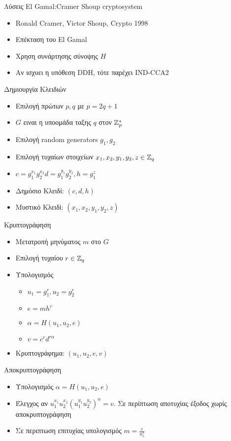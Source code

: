 \documentclass{beamer}
\begin{document}
\begin{frame}[allowframebreaks]{Λύσεις El Gamal:Cramer Shoup cryptosystem \cite{cs98}}
\begin{itemize}
\item Ronald Cramer, Victor Shoup, Crypto 1998
\item Επέκταση του El Gamal
\item Χρηση συνάρτησης σύνοψης $H$
\item Αν ισχυει η υπόθεση DDH, τότε παρέχει IND-CCA2
\end{itemize}

\begin{block}{Δημιουργία Κλειδιών}
\begin{itemize}
\item Επιλογή πρώτων $p,q$ με $p=2q+1$
\item $G$ ειναι η υποομάδα ταξης $q$ στον $\mathbb{Z}_{p}^*$
\item Επιλογή random generators $g_1, g_2$

\item Επιλογή τυχαίων στοιχείων $x_1,x_2,y_1,y_2,z \in \mathbb{Z}_{q}$
\item $c=g_1^{x_1}g_2^{x_2} d=g_1^{y_1}g_2^{y_2},h=g_1^{z}$
\item Δημόσιο Κλειδί: $(c,d,h)$
\item Μυστικό Κλειδί: $(x_1,x_2,y_1,y_2,z)$
\end{itemize}
\end{block}

\begin{block}{Κρυπτογράφηση}
\begin{itemize}
\item Μετατροπή μηνύματος $m$ στο $G$
\item Επιλογή τυχαίου $r \in \mathbb{Z}_{q}$
\item Υπολογισμός
\begin{itemize} 
\item $u_1 = g_1^r,u_2 = g_2^r$
\item $e = m h^r$
\item $\alpha = H(u_1,u_2,e)$
\item $v = c^r d^{r\alpha}$ 
\end{itemize}
\item Κρυπτογράφημα: $(u_1,u_2,e,v)$
\end{itemize}
\end{block}

\begin{block}{Αποκρυπτογράφηση}
\begin{itemize}
\item Υπολογισμός $\alpha = H(u_1,u_2,e)$
\item Έλεγχος αν $u_1^{x_1}u_2^{x_2}(u_1^{y_1}u_2^{y_2})^\alpha=v$. Σε περίπτωση αποτυχίας έξοδος χωρίς αποκρυπτογράφηση
\item Σε περιπτωση επιτυχίας υπολογισμός $m = \frac{e}{u_1^z}$
\end{itemize}
\end{block}


\end{frame}
\end{document}
